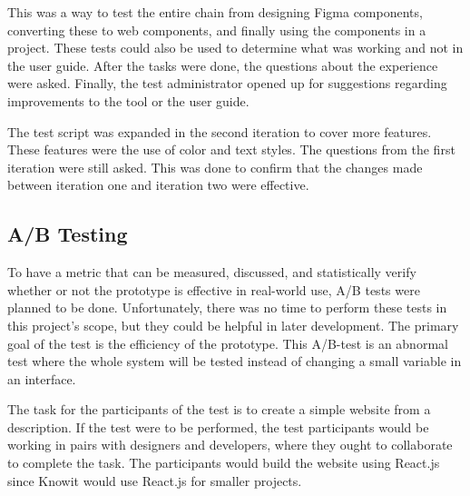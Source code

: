 This was a way to test the entire chain from designing Figma \glspl{component}, converting these to web \glspl{component}, and finally using the \glspl{component} in a project. These tests could also be used to determine what was working and not in the user guide. After the tasks were done, the questions about the experience were asked. Finally, the test administrator opened up for suggestions regarding improvements to the tool or the user guide. 

The test script was expanded in the second iteration to cover more features. These features were the use of color and text styles. The questions from the first iteration were still asked. This was done to confirm that the changes made between iteration one and iteration two were effective. 


\subsection{ A/B Testing }%
\label{sub:ab-testing}
To have a metric that can be measured, discussed, and statistically verify whether or not the prototype is effective in real-world use, A/B tests were planned to be done. Unfortunately, there was no time to perform these tests in this project's scope, but they could be helpful in later development. The primary goal of the test is the efficiency of the prototype. This A/B-test is an abnormal test where the whole system will be tested instead of changing a small variable in an interface. 




The task for the participants of the test is to create a simple website from a description. If the test were to be performed, the test participants would be working in pairs with designers and developers, where they ought to collaborate to complete the task. The participants would build the website using React.js since Knowit would use React.js for smaller projects. 

